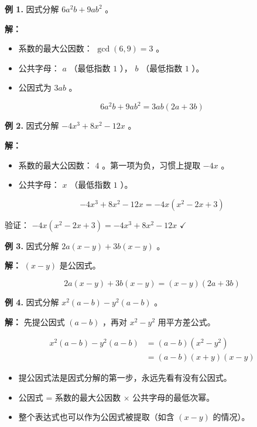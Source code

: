 \begin{workedexamples}


\textbf{例 1.} 因式分解 $6a^2b + 9ab^2$ 。

\textbf{解：}

\begin{itemize}
  \item 系数的最大公因数： $\gcd(6, 9) = 3$ 。
  \item 公共字母： $a$ （最低指数 $1$ ）， $b$ （最低指数 $1$ ）。
  \item 公因式为 $3ab$ 。
\end{itemize}


\[
6a^2b + 9ab^2 = 3ab(2a + 3b)
\]


\textbf{例 2.} 因式分解 $-4x^3 + 8x^2 - 12x$ 。

\textbf{解：}

\begin{itemize}
  \item 系数的最大公因数： $4$ 。第一项为负，习惯上提取 $-4x$ 。
  \item 公共字母： $x$ （最低指数 $1$ ）。
\end{itemize}


\[
-4x^3 + 8x^2 - 12x = -4x(x^2 - 2x + 3)
\]


验证： $-4x(x^2 - 2x + 3) = -4x^3 + 8x^2 - 12x$ $\checkmark$

\textbf{例 3.} 因式分解 $2a(x - y) + 3b(x - y)$ 。

\textbf{解：} $(x - y)$ 是公因式。

\[
2a(x - y) + 3b(x - y) = (x - y)(2a + 3b)
\]


\textbf{例 4.} 因式分解 $x^2(a - b) - y^2(a - b)$ 。

\textbf{解：} 先提公因式 $(a - b)$ ，再对 $x^2 - y^2$ 用平方差公式。

\[
\begin{aligned}
x^2(a - b) - y^2(a - b) &= (a - b)(x^2 - y^2) \\
&= (a - b)(x + y)(x - y)
\end{aligned}
\]


\end{workedexamples}

\begin{keytakeaway}


\begin{itemize}
  \item 提公因式法是因式分解的第一步，永远先看有没有公因式。
  \item 公因式 = 系数的最大公因数 $\times$ 公共字母的最低次幂。
  \item 整个表达式也可以作为公因式被提取（如含 $(x-y)$ 的情况）。
\end{itemize}


\end{keytakeaway}

